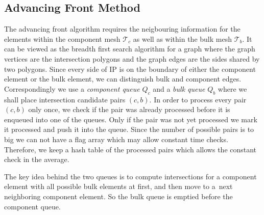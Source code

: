 \documentclass{elsarticle}
\newcommand{\noteJB}[1]{{\color{Blue} \textbf{JB: } \textit{#1}}}
\begin{document}
\subsection{Advancing Front Method}
\label{sec:front}
The advancing front algorithm requires the neigbouring information for the elements within the component mesh $\mathcal T_c$ 
as well as within the bulk mesh $\mathcal T_b$. It can be viewed as the breadth first search algorithm for a graph where the graph vertices are 
the intersection polygons and the graph edges are the sides shared by two polygons. Since every side of IP is on the boundary of either 
the component element or the bulk element, we can distinguish bulk and component edges. 
Correspondingly we use a \emph{component queue} $Q_c$ and a \emph{bulk queue} $Q_b$ where we shall place intersection candidate pairs $(c,b)$.
In order to process every pair $(c,b)$ only once, we check if the pair was already processed before it is enqueued into one of the queues.
Only if the pair was not yet processed we mark it processed and push it into the queue. Since the number of possible pairs is to big we can not have a flag array
which may allow constant time checks. Therefore, we keep a hash table of the processed pairs which allows the constant check in the average.

The key idea behind the two queues is to compute intersections for a component element with all possible bulk elements at first,
and then move to a~next neighboring component element. So the bulk queue is emptied before the component queue.
%   
%             
%   
\end{document}
